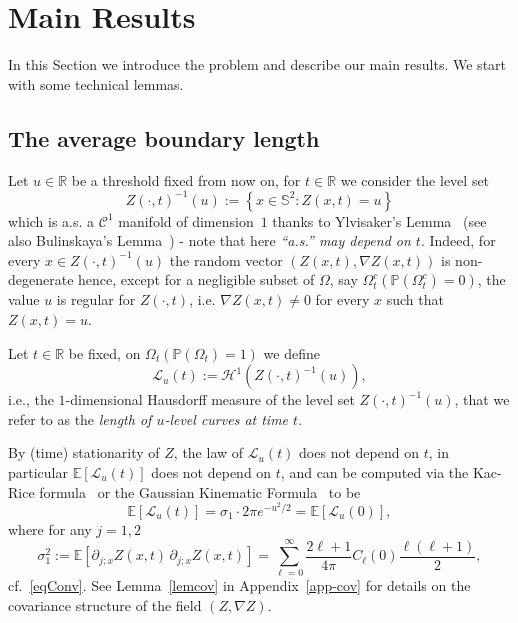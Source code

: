 \documentclass[AHL,Unicode,longabstracts,published]{cedram}
\newcommand{\clC}{\mathcal{C}}
\newcommand{\clL}{\mathcal{L}}
\newcommand{\clH}{\mathcal{H}}
\newcommand{\bbS}{\mathbb{S}}
\newcommand{\bbR}{\mathbb{R}}
\newcommand{\bbP}{\mathbb{P}}
\newcommand{\bbE}{\mathbb{E}}
\begin{document}
\section{Main Results}\label{sec-MR}

In this Section we introduce the problem and describe our main results. We start with some technical lemmas.

\subsection{The average boundary length}
\label{subsec-object}

Let $u\in \bbR$ be a threshold fixed from now on, for $t\in \bbR$ we consider the level set
\begin{equation*}
Z(\cdot, t)^{-1}(u):=\left\{ x\in \bbS^2 : Z(x,t) = u\right\}
\end{equation*}
which is a.s. a $\clC^1$ manifold of dimension~$1$ thanks to Ylvisaker's Lemma~\cite[Theorem~1.21]{AW:09} (see also Bulinskaya's Lemma~\cite[Proposition~1.20]{AW:09}) - note that here \emph{``a.s.'' may depend on $t$}. Indeed, for every $x\in Z(\cdot, t)^{-1}(u)$ the random vector $(Z(x,t), \nabla Z(x,t))$ is non-degenerate hence, except for a negligible subset of $\Omega$, say $\Omega_t^c (\bbP(\Omega_t^c)=0)$, the value $u$ is regular for $Z(\cdot, t)$, i.e. $\nabla Z(x, t)\ne 0$ for every $x$ such that $Z(x,t)=u$.

Let $t\in \bbR$ be fixed, on $\Omega_t (\bbP(\Omega_t)=1)$ we define
\begin{equation}\label{length}
\clL_u(t) := \clH^1\left(Z(\cdot, t)^{-1}(u)\right),
\end{equation}
i.e., the $1$-dimensional Hausdorff measure of the level set $Z(\cdot, t)^{-1}(u)$, that we refer to as the \emph{length of $u$-level curves at time $t$}.

By (time) stationarity of $Z$, the law of $\clL_u(t)$ does not depend on $t$, in particular $\bbE[\clL_u(t)]$ does not depend on $t$, and can be computed via the Kac-Rice formula~\cite[Theorem~6.8]{AW:09} or the Gaussian Kinematic Formula~\cite[Theorem~13.2.1]{adlertaylor} to be
\begin{equation}\label{meanGKF}
\bbE[\clL_u(t)] = \sigma_1 \cdot 2\pi e^{-u^2/2} = \bbE[\clL_u(0)],
\end{equation}
where for any $j=1,2$
\begin{equation}\label{sigma1}
\sigma _{1}^{2}:=\bbE\left[\partial _{j;x}Z(x,t)\,\partial _{j;x}Z(x,t)\right] =\sum_{\ell =0}^{\infty}\frac{2\ell +1}{4\pi }C_{\ell }(0)\frac{\ell (\ell +1)}{2},
\end{equation}
cf.~\eqref{eqConv}. See Lemma~\ref{lemcov} in Appendix~\ref{app-cov} for details on the covariance structure of the field $(Z, \nabla Z)$.
\end{document}
